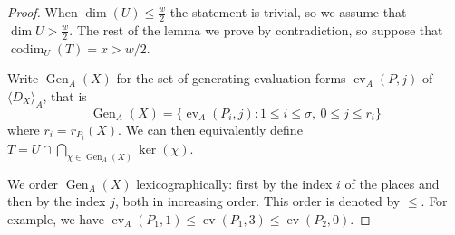 \documentclass[12pt]{amsart}
\renewcommand{\leq}{\leqslant}
\newcommand{\codim}{\operatorname{codim}}
\DeclareMathOperator{\ev}{ev}
\DeclareMathOperator{\Gen}{Gen}
\theoremstyle{definition}
\newcommand{\divi}[1]{\langle #1 \rangle}
\begin{document}
	\begin{proof}
		When $\dim (U) \leq \frac w 2$ the statement is trivial, so we assume that $\dim U > \frac w2$. The rest of the lemma we prove by contradiction, so suppose that $\codim_U(T) = x > w/2$. 
		
		Write $\operatorname{Gen}_A(X)$ for the set of generating evaluation forms $\ev_A(P, j)$ of $\divi {D_X}_A$, that is
		$$ \Gen_{A}(X)= \{\ev_{A}(P_i,j):1\le i\le \sigma,\ 0\le j\le r_i\} $$
		where $r_i= r_{P_i} (X)$. We can then equivalently define $T = U \cap \bigcap_{\chi \in \Gen_{A}(X)} \ker(\chi).$
		
		We order $\Gen_A(X)$ lexicographically: first by the index $i$ of the places and then by the index $j$, both in increasing order. This order is denoted by $\leq$. For example, we have $\ev_A(P_1, 1) \leq \ev(P_1, 3) \leq \ev(P_2, 0).$ 
		

\end{proof}
\end{document}
